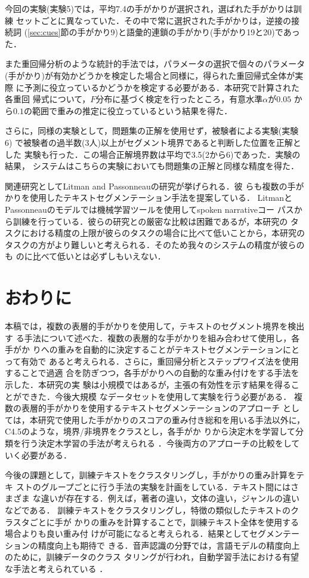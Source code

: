 今回の実験(実験5)では，平均7.4の手がかりが選択され，選ばれた手がかりは訓練
セットごとに異なっていた．その中で常に選択された手がかりは，逆接の接続詞
(\ref{sec:cues}節の手がかり9)と語彙的連鎖の手がかり(手がかり19と20)であっ
た．

また重回帰分析のような統計的手法では，パラメータの選択で個々のパラメータ
(手がかり)が有効かどうかを検定した場合と同様に，得られた重回帰式全体が実際
に予測に役立っているかどうかを検定する必要がある．本研究で計算された各重回
帰式について，$F$分布に基づく検定を行ったところ，有意水準$\alpha$が$0.05$
から$0.1$の範囲で重みの推定に役立っているという結果を得た．

さらに，同様の実験として，問題集の正解を使用せず，被験者による実験(実験6)
で被験者の過半数(3人)以上がセグメント境界であると判断した位置を正解とした
実験も行った．この場合正解境界数は平均で3.5(2から6)であった．実験の結果，
システムはこちらの実験においても問題集の正解と同様な精度を得た．

関連研究としてLitman and Passonneau\cite{Litman:95}の研究が挙げられる．彼
らも複数の手がかりを使用したテキストセグメンテーション手法を提案している．
LitmanとPassonneauのモデルでは機械学習ツールを使用してspoken narrativeコー
パスから訓練を行っている．彼らの研究との厳密な比較は困難であるが，本研究の
タスクにおける精度の上限が彼らのタスクの場合に比べて低いことから，本研究の
タスクの方がより難しいと考えられる．そのため我々のシステムの精度が彼らのも
のに比べて低いとは必ずしもいえない．

\section{おわりに}
本稿では，複数の表層的手がかりを使用して，テキストのセグメント境界を検出す
る手法について述べた．複数の表層的な手がかりを組み合わせて使用し，各手がか
りへの重みを自動的に決定することがテキストセグメンテーションにとって有効で
あると考えられる．さらに，重回帰分析とステップワイズ法を使用することで過適
合を防ぎつつ，各手がかりへの自動的な重み付けをする手法を示した．本研究の実
験は小規模ではあるが，主張の有効性を示す結果を得ることができた．今後大規模
なデータセットを使用して実験を行う必要がある．
複数の表層的手がかりを使用するテキストセグメンテーションのアプローチ
としては，本研究で使用した手がかりのスコアの重み付き総和を用いる手法以外に，
C4.5\cite{Quinlan:93}のような，境界/非境界をクラスとし，各手がか
りから決定木を学習して分類を行う決定木学習の手法が考えられる
\cite{Litman:95,Honda:96}．今後両方のアプローチの比較をしていく必要がある．

今後の課題として，訓練テキストをクラスタリングし，手がかりの重み計算をテキ
ストのグループごとに行う手法の実験を計画をしている．テキスト間にはさまざま
な違いが存在する．例えば，著者の違い，文体の違い，ジャンルの違いなどである．
訓練テキストをクラスタリングし，特徴の類似したテキストのクラスタごとに手が
かりの重みを計算することで，訓練テキスト全体を使用する場合よりも良い重み付
けが可能になると考えられる．結果としてセグメンテーションの精度向上も期待で
きる．音声認識の分野では，言語モデルの精度向上のために，訓練データのクラス
タリングが行われ，自動学習手法における有望な手法と考えられている
\cite{Carter:94,Iyer:94}．

